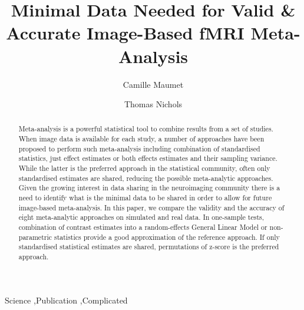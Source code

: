 \documentclass[preprint,12pt]{elsarticle}
\begin{document}
\begin{frontmatter}


\title{Minimal Data Needed for Valid \& Accurate Image-Based fMRI Meta-Analysis}




\author{Camille Maumet}
\author{Thomas Nichols}

\address{WMG, University of Warwick, Coventry, UK}
\address{Statistics Department, University of Warwick, Coventry, UK.}

\begin{abstract}
Meta-analysis is a powerful statistical tool to combine results from a set of studies. When image data is available for each study, a number of approaches have been proposed to perform such meta-analysis including combination of standardised statistics, just effect estimates or both effects estimates and their sampling variance. While the latter is the preferred approach in the statistical community, often only standardised estimates are shared, reducing the possible meta-analytic approaches. Given the growing interest in data sharing in the neuroimaging community there is a need to identify what is the minimal data to be shared in order to allow for future image-based meta-analysis. In this paper, we compare the validity and the accuracy of eight meta-analytic approaches on simulated and real data. In one-sample tests, combination of contrast estimates into a random-effects General Linear Model or non-parametric statistics provide a good approximation of the reference approach. If only standardised statistical estimates are shared, permutations of z-score is the preferred approach.
\end{abstract}

\begin{keyword}
Science \sep Publication \sep Complicated


\end{keyword}

\end{frontmatter}
\end{document}
